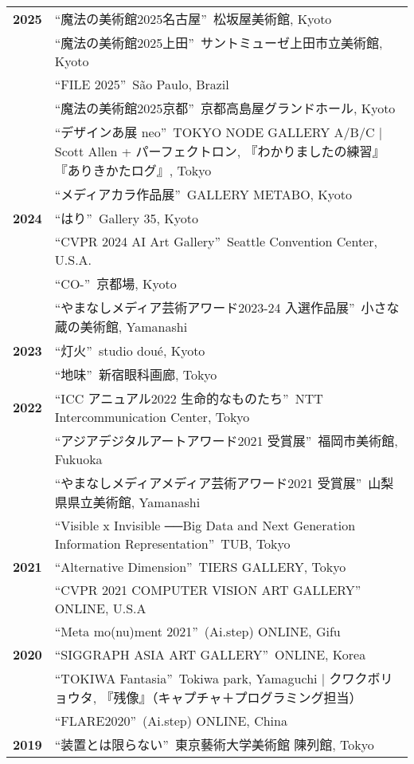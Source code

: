 \documentclass[8pt,a4paper]{article}
\begin{document}
\begin{longtable}{@{}p{1.2cm}@{\hspace{0.5cm}}p{14cm}@{}}
\textbf{2025} & ``魔法の美術館2025名古屋''\, 松坂屋美術館, Kyoto \\
& ``魔法の美術館2025上田''\, サントミューゼ上田市立美術館, Kyoto \\
& ``FILE 2025''\, São Paulo, Brazil \\
& ``魔法の美術館2025京都''\, 京都高島屋グランドホール, Kyoto \\
& ``デザインあ展 neo''\, TOKYO NODE GALLERY A/B/C | Scott Allen + パーフェクトロン, 『わかりましたの練習』『ありきかたログ』, Tokyo \\
& ``メディアカラ作品展''\, GALLERY METABO, Kyoto \\[0.2em]
\textbf{2024} & ``はり''\, Gallery 35, Kyoto \\
& ``CVPR 2024 AI Art Gallery''\, Seattle Convention Center, U.S.A. \\
& ``CO-''\, 京都場, Kyoto \\
& ``やまなしメディア芸術アワード2023\mbox{-}24 入選作品展''\, 小さな蔵の美術館, Yamanashi \\[0.2em]
\textbf{2023} & ``灯火''\, studio doué, Kyoto \\
& ``地味''\, 新宿眼科画廊, Tokyo \\[0.2em]
\textbf{2022} & ``ICC アニュアル2022 生命的なものたち''\, NTT Intercommunication Center, Tokyo \\
& ``アジアデジタルアートアワード2021 受賞展''\, 福岡市美術館, Fukuoka \\
& ``やまなしメディアメディア芸術アワード2021 受賞展''\, 山梨県県立美術館, Yamanashi \\
& ``Visible x Invisible ──Big Data and Next Generation Information Representation''\, TUB, Tokyo \\[0.2em]
\textbf{2021} & ``Alternative Dimension''\, TIERS GALLERY, Tokyo \\
& ``CVPR 2021 COMPUTER VISION ART GALLERY''\, ONLINE, U.S.A \\
& ``Meta mo(nu)ment 2021''\, (Ai.step) ONLINE, Gifu \\[0.2em]
\textbf{2020} & ``SIGGRAPH ASIA ART GALLERY''\, ONLINE, Korea \\
& ``TOKIWA Fantasia''\, Tokiwa park, Yamaguchi | クワクボリョウタ, 『残像』（キャプチャ＋プログラミング担当） \\
& ``FLARE2020''\, (Ai.step) ONLINE, China \\[0.2em]
\textbf{2019} & ``装置とは限らない''\, 東京藝術大学美術館 陳列館, Tokyo \\

\end{longtable}
\end{document}
